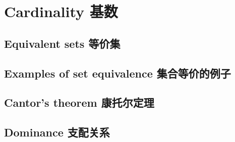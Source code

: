 \chapter{Cardinality 基数}


\section{Equivalent sets 等价集}




\newpage

\section{Examples of set equivalence 集合等价的例子}




\newpage

\section{Cantor's theorem 康托尔定理}




\newpage

\section{Dominance 支配关系}






%
 
